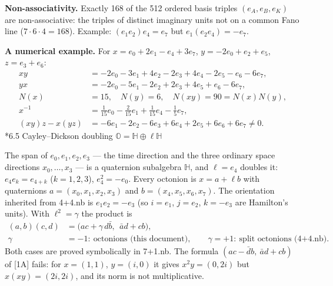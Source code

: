 \documentclass[10pt,a4paper]{article}
\makeatletter
\renewcommand\subsection{\@startsection{subsection}{2}{\z@}{-3.25ex\@plus -1ex \@minus -.2ex}{1.5ex \@plus .2ex}{\normalfont\large\bfseries\raggedright}}
\makeatother
\begin{document}
\textbf{Non-associativity.} Exactly 168 of the 512 ordered basis triples $(e_A,e_B,e_K)$ are non-associative: the triples of distinct imaginary units not on a common Fano line ($7\cdot6\cdot4=168$). Example: $(e_1e_2)e_4=e_7$ but $e_1(e_2e_4)=-e_7$.

\textbf{A numerical example.} For $x=e_{0}+2e_{1}-e_{4}+3e_{7}$, $y=-2e_{0}+e_{2}+e_{5}$, $z=e_{3}+e_{6}$:
\begin{align*}
xy&=-2e_{0}-3e_{1}+4e_{2}-2e_{3}+4e_{4}-2e_{5}-e_{6}-6e_{7}, \\
yx&=-2e_{0}-5e_{1}-2e_{2}+2e_{3}+4e_{5}+e_{6}-6e_{7}, \\
N(x)&=15,\quad N(y)=6,\quad N(xy)=90=N(x)N(y), \\
x^{-1}&=\frac{1}{15}e_{0}-\frac{2}{15}e_{1}+\frac{1}{15}e_{4}-\frac{1}{5}e_{7}, \\
(xy)z-x(yz)&=-6e_{1}-2e_{2}-6e_{3}+6e_{4}+2e_{5}+6e_{6}+6e_{7}\neq0 .
\end{align*}
\subsection*{6.5 Cayley–Dickson doubling \texorpdfstring{$\mathbb O=\mathbb H\oplus\ell\mathbb H$}{𝕆=ℍ⊕ℓℍ}}
The span of $e_0,e_1,e_2,e_3$ — the time direction and the three ordinary space directions $x_0,\dots,x_3$ — is a quaternion subalgebra $\mathbb H$, and $\ell=e_4$ doubles it: $e_4e_k=e_{4+k}$ ($k=1,2,3$), $e_4^2=-e_0$. Every octonion is $x=a+\ell b$ with quaternions $a=(x_0,x_1,x_2,x_3)$ and $b=(x_4,x_5,x_6,x_7)$. The orientation inherited from 4+4.nb is $e_1e_2=-e_3$ (so $i=e_1$, $j=e_2$, $k=-e_3$ are Hamilton's units). With $\ell^2=\gamma$ the product is
\begin{align*}
(a,b)(c,d)&=\big(ac+\gamma\,d\bar b,\ \ \bar a d+cb\big), \\
\gamma&=-1:\ \text{octonions (this document)},\qquad \gamma=+1:\ \text{split octonions (4+4.nb)}.
\end{align*}
Both cases are proved symbolically in 7+1.nb. The formula $(ac-\bar d b,\ \bar a d+cb)$ of [1A] fails: for $x=(1,1)$, $y=(i,0)$ it gives $x^2y=(0,2i)$ but $x(xy)=(2i,2i)$, and its norm is not multiplicative.
\end{document}
